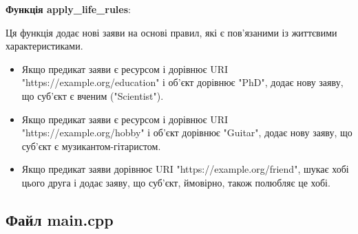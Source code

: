 \documentclass[12pt, a4paper]{article}
\begin{document}
\textbf{Функція apply\_life\_rules}:

Ця функція додає нові заяви на основі правил, які є пов'язаними із життєвими характеристиками.

\begin{itemize}
    \item Якщо предикат заяви є ресурсом і дорівнює URI "https://example.org/education" і об'єкт дорівнює "PhD", додає нову заяву, що суб'єкт є вченим ("Scientist").
    \item Якщо предикат заяви є ресурсом і дорівнює URI "https://example.org/hobby" і об'єкт дорівнює "Guitar", додає нову заяву, що суб'єкт є музикантом-гітаристом.
    \item Якщо предикат заяви дорівнює URI "https://example.org/friend", шукає хобі цього друга і додає заяву, що суб'єкт, ймовірно, також полюбляє це хобі.
\end{itemize}

\subsection{Файл main.cpp}
\end{document}
